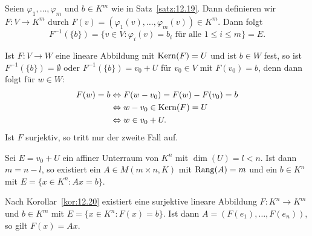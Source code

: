 \begin{beweis}
	Seien $\varphi_1,\dots,\varphi_m$ und $b \in K^m$ wie in Satz~\ref{satz:12.19}.
	Dann definieren wir $F \colon V \rightarrow K^m$ durch $F(v) = (\varphi_1(v),\dots,\varphi_m(v)) \in K^m$.
	Dann folgt
	\[
		F^{-1}(\{b\}) = \{v \in V : \varphi_i(v) = b_i \text{ für alle } 1 \leq i \leq m\} = E. 
	\]
\end{beweis}

\begin{bemerkung}
	\label{bem:12.21}
	Ist $F \colon V \rightarrow W$ eine lineare Abbildung mit $\operatorname{Kern}(F) = U$ und ist $b \in W$ fest, so ist $F^{-1}(\{b\}) = \emptyset$ oder $F^{-1}(\{b\}) = v_0 + U$ für $v_0 \in V$ mit $F(v_0) = b$, denn dann folgt für $w \in W$:
	\begin{align*}
		F(w) = b &\Leftrightarrow F(w-v_0) = F(w) - F(v_0) = b \\
		&\Leftrightarrow w-v_0 \in \operatorname{Kern}(F) = U \\
		&\Leftrightarrow w \in v_0 + U.
	\end{align*}
	Ist $F$ surjektiv, so tritt nur der zweite Fall auf.
\end{bemerkung}

\begin{korollar}
	\label{kor:12.22}
	Sei $E = v_0 + U$ ein affiner Unterraum von $K^n$ mit $\dim(U) = l < n$.
	Ist dann $m = n-l$, so existiert ein $A \in M(m \times n,K)$ mit $\operatorname{Rang}(A) = m$ und ein $b \in K^n$ mit $E = \{x \in K^n : Ax = b\}$.
\end{korollar}

\begin{beweis}
	Nach Korollar~\ref{kor:12.20} existiert eine surjektive lineare Abbildung $F \colon K^n \rightarrow K^m$ und $b \in K^m$ mit $E = \{x \in K^n : F(x) = b\}$.
	Ist dann $A = (F(e_1),\dots,F(e_n))$, so gilt $F(x) = Ax$. 
\end{beweis}

